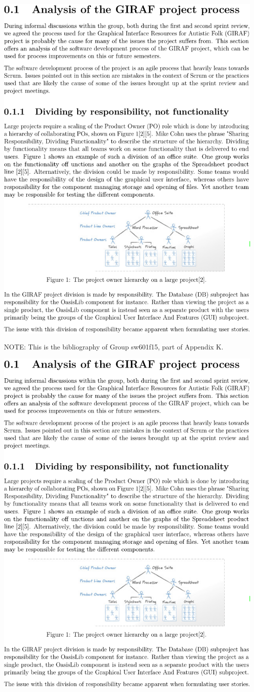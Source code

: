 \noindent\includegraphics[page=6,width=1\textwidth]{part_appendix/sw601f15.pdf}

\clearpage{}\noindent\textsf{NOTE:} This is the bibliography of Group sw601f15, part of Appendix K\@.

\noindent\includegraphics[page=7,width=1\textwidth]{part_appendix/sw601f15.pdf}